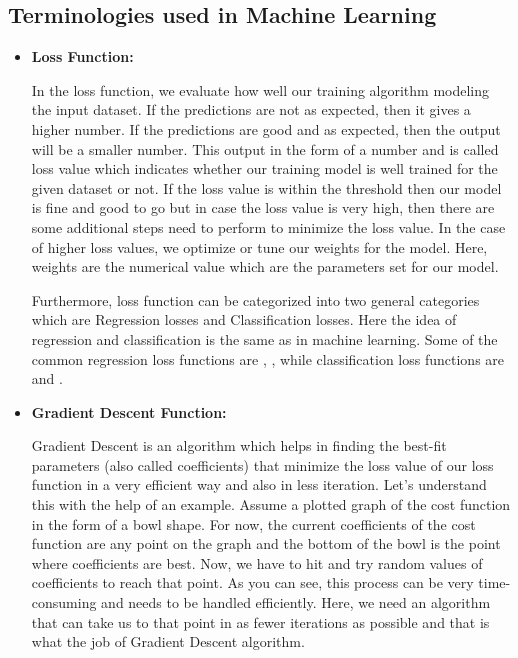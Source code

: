 \subsection{Terminologies used in Machine Learning}
\begin{itemize}
  \item \textbf{Loss Function:} 
  \par
  In the loss function, we evaluate how well our training algorithm modeling the input dataset.  If the predictions are not as expected, then it gives a higher number. If the predictions are good and as expected, then the output will be a smaller number. This output in the form of a number and is called loss value which indicates whether our training model is well trained for the given dataset or not.  If the loss value is within the threshold then our model is fine and good to go but in case the loss value is very high, then there are some additional steps need to perform to minimize the loss value.  In the case of higher loss values, we optimize or tune our weights for the model. Here, weights are the numerical value which are the parameters set for our model.
  \newline
  \par
    Furthermore, loss function can be categorized into two general categories which are Regression losses and Classification losses. Here the idea of regression and classification is the same as in machine learning. Some of the common regression loss functions are , ,  while classification loss functions are  and .
  \item  \textbf{Gradient Descent Function:}
  \par
  Gradient Descent \cite{gd} is an algorithm which helps in finding the best-fit parameters (also called coefficients) that minimize the loss value of our loss function in a very efficient way and also in less iteration. Let's understand this with the help of an example. Assume a plotted graph of the cost function in the form of a bowl shape. For now, the current coefficients of the cost function are any point on the graph and the bottom of the bowl is the point where coefficients are best. Now, we have to hit and try random values of coefficients to reach that point. As you can see, this process can be very time-consuming and needs to be handled efficiently. Here, we need an algorithm that can take us to that point in as fewer iterations as possible and that is what the job of Gradient Descent algorithm.

\end{itemize}

